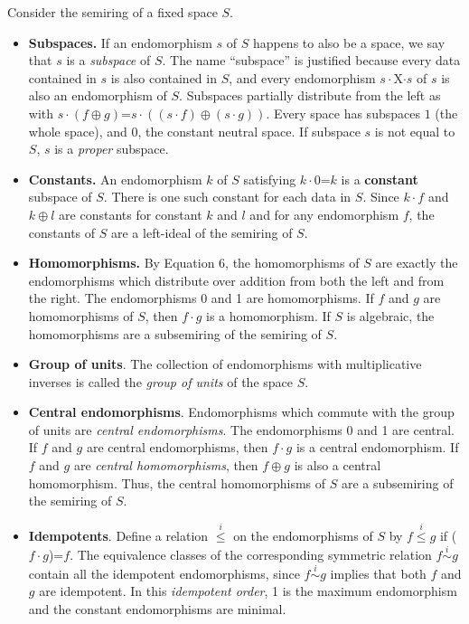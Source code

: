 \documentclass[11pt]{article}
\begin{document}
Consider the semiring of a fixed space $S$.  
\begin{itemize}

\item{{\bf Subspaces.} If an endomorphism $s$ of $S$ happens to also be a space, we say that $s$ is a {\it subspace} of $S$.  The name ``subspace'' is justified because every data contained in $s$ is also contained in $S$, and every endomorphism $s\cdot$X$\cdot s$ of $s$ is also an endomorphism of $S$.  
Subspaces partially distribute from the left as with $s\cdot(f\oplus g)$=$s\cdot((s\cdot f)\oplus(s\cdot g))$.
Every space has subspaces $1$ (the whole space), and $0$, the constant neutral space.  If subspace $s$ is not equal to $S$, $s$ is a {\it proper} subspace.} 

\item{{\bf Constants.}  An endomorphism $k$ of $S$ satisfying $k\cdot 0$=$k$ is a {\bf constant} subspace of $S$.  There is one such constant for each 
data in $S$.  Since $k\cdot f$ and $k\oplus l$ are constants for 
constant $k$ and $l$ and for any endomorphism $f$, the constants of $S$ are a left-ideal of the semiring of $S$.} 

\item{{\bf Homomorphisms.}  By Equation 6, the homomorphisms of $S$ are exactly the endomorphisms which distribute over addition from
both the left and from the right.  The endomorphisms 0 and 1 are homomorphisms.  If $f$ and $g$ are homomorphisms of $S$, then 
$f\cdot g$ is a homomorphism.  If $S$ is algebraic, the homomorphisms are a subsemiring of the semiring of $S$.} 

\item {{\bf Group of units}. The collection of endomorphisms with multiplicative inverses is called the {\it group of units} of the space $S$.} 

\item{{\bf Central endomorphisms}.  Endomorphisms which commute with the group of units are {\it central endomorphisms}.  The endomorphisms 0 and 1 
are central.  If $f$ and $g$ are central endomorphisms, then $f\cdot g$ is a central endomorphism.  If $f$ and $g$ are {\it central homomorphisms}, then 
$f\oplus g$ is also a central homomorphism.  Thus, the central homomorphisms of $S$ are a subsemiring of the semiring of $S$.}

\item{{\bf Idempotents}.  Define a relation ${\overset i \leq}$ on the endomorphisms of $S$ by $f{\overset i \leq}g$ if ($f\cdot g$)=$f$.  The equivalence 
classes of the corresponding symmetric relation $f{\overset i \sim} g$ contain all the idempotent endomorphisms, since $f{\overset i\sim}g$ implies that 
both $f$ and $g$ are idempotent.  In this {\it idempotent order}, 1 is the maximum endomorphism and the constant endomorphisms are minimal.}


\end{itemize}
\end{document}
